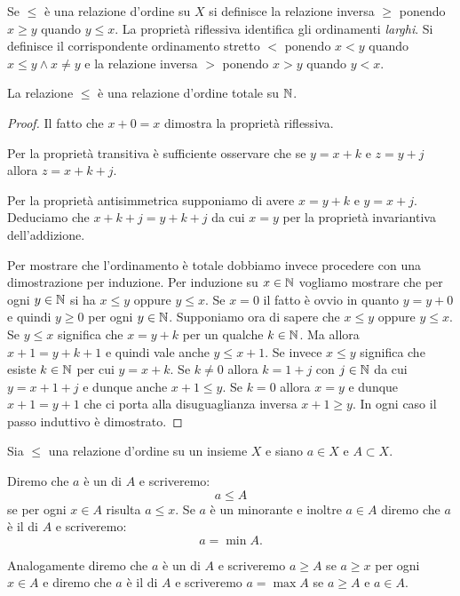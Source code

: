 Se $\le$ è una relazione d'ordine su $X$ si definisce la 
relazione inversa $\ge$ ponendo $x\ge y$ quando $y\le x$.
La proprietà riflessiva identifica gli ordinamenti \emph{larghi}.
Si definisce il corrispondente ordinamento stretto $<$
ponendo $x < y$ quando $x\le y \land x\neq y$
e la relazione inversa $>$ ponendo $x>y$ quando $y<x$.
  
\begin{theorem}
La relazione $\le$ è una relazione d'ordine totale su ${\mathbb N}$.
\end{theorem}
%
\begin{proof}
  Il fatto che $x+0=x$ dimostra la proprietà riflessiva.
  
  Per la proprietà transitiva è sufficiente osservare
  che se $y=x+k$ e $z=y+j$ allora $z=x+k+j$.

  Per la proprietà antisimmetrica supponiamo di avere $x=y+k$ 
  e $y=x+j$. Deduciamo che $x+k+j = y +k+j$ da cui $x=y$
  per la proprietà invariantiva dell'addizione.
  
  Per mostrare che l'ordinamento è totale dobbiamo invece 
  procedere con una dimostrazione per induzione. 
  Per induzione su $x\in {\mathbb N}$ vogliamo mostrare 
  che per ogni $y\in {\mathbb N}$ si ha $x\le y$ oppure $y\le x$. 
  Se $x=0$ il fatto è ovvio in quanto $y=y+0$ e quindi $y\ge 0$
  per ogni $y\in {\mathbb N}$.
  Supponiamo ora di sapere che $x\le y$ oppure $y\le x$.
  Se $y\le x$ significa che $x = y + k$ per un qualche 
  $k\in {\mathbb N}$. Ma allora $x+1 = y + k + 1$ e quindi 
  vale anche $y\le x+1$. 
  Se invece $x\le y$ significa che esiste $k\in {\mathbb N}$ 
  per cui $y=x+k$. Se $k\neq 0$ allora $k=1+j$ con $j\in {\mathbb N}$
  da cui $y=x+1+j$ e dunque anche $x+1\le y$.
  Se $k=0$ allora $x=y$ e dunque $x+1=y+1$ che ci porta 
  alla disuguaglianza inversa $x+1\ge y$.
  In ogni caso il passo induttivo è dimostrato.
\end{proof}

\begin{definition}
  \label{def:minorante}%
  \label{def:minimo}%
  Sia $\le$ una relazione d'ordine su un insieme $X$ e siano 
  $a\in X$ e $A\subset X$.

  Diremo che $a$ è un  di $A$ e scriveremo:
  \[
    a \le A
  \]
  se per ogni $x\in A$ risulta $a\le x$. 
  Se $a$ è un minorante e inoltre $a\in A$ diremo 
  che $a$ è il  di $A$ e scriveremo:
  \[
    a = \min A.  
  \] 

  Analogamente diremo che $a$ è un 
  di $A$ e scriveremo $a \ge A$ se $a\ge x$ per ogni $x\in A$ 
  e diremo che $a$ è il  di $A$ 
  e scriveremo $a=\max A$ se $a\ge A$ e $a\in A$.
\end{definition}

